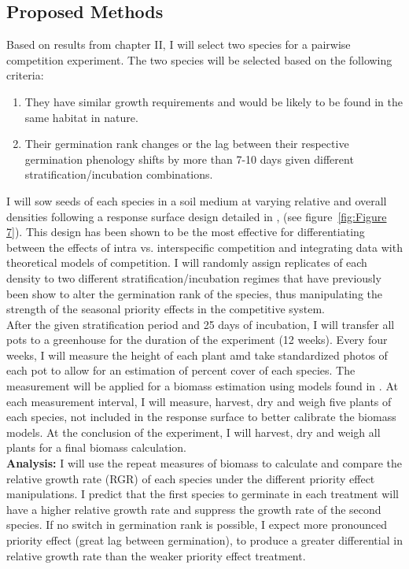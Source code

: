 \documentclass[12pt]{article}\usepackage[]{graphicx}\usepackage[]{color}
\begin{document}
\subsection*{Proposed Methods}
\indent\indent Based on results from chapter II, I will select two species for a pairwise competition experiment. The two species will be selected based on the following criteria:
\begin{enumerate}
\item They have similar growth requirements and would be likely to be found in the same habitat in nature.
\item Their germination rank changes or the lag between their respective germination phenology shifts by more than 7-10 days given different stratification/incubation combinations.
\end{enumerate}
\indent\indent I will sow seeds of each species in a soil medium at varying relative and overall densities following a response surface design detailed in \cite{Inouye2001}, (see figure~\ref{fig:Figure 7}). This design has been shown to be the most effective for differentiating between the effects of intra vs. interspecific competition and integrating data with theoretical models of competition. I will randomly assign replicates of each density to two different stratification/incubation regimes that have previously been show to alter the germination rank of the species, thus manipulating the strength of the seasonal priority effects in the competitive system.\\
\indent After the given stratification period and 25 days of incubation, I will transfer all pots to a greenhouse for the duration of the experiment (12 weeks). Every four weeks, I will measure the height of each plant amd take standardized photos of each pot to allow for an estimation of percent cover of each species. The measurement will be applied for a biomass estimation using models found in \citet{Axmanova2012}. At each measurement interval, I will measure, harvest, dry and weigh five plants of each species, not included in the response surface to better calibrate the biomass models. At the conclusion of the experiment, I will harvest, dry and weigh all plants for a final biomass calculation.\\
\indent\textbf{Analysis:} I will use the repeat measures of biomass to calculate and compare the relative growth rate (RGR) \citep{Connolly2005} of each species under the different priority effect manipulations. I predict that the first species to germinate in each treatment will have a higher relative growth rate and suppress the growth rate of the second species. If no switch in germination rank is possible, I expect more pronounced priority effect (great lag between germination), to produce a greater differential in relative growth rate than the weaker priority effect treatment.\\  
\end{document}

